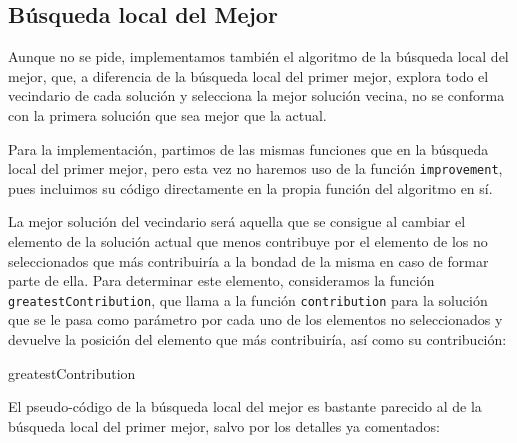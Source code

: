 \documentclass[11pt,a4paper]{article}
\begin{document}
	\subsection{Búsqueda local del Mejor}
	
	Aunque no se pide, implementamos también el algoritmo de la búsqueda local del mejor, que, a diferencia de la búsqueda local del primer mejor, explora todo el vecindario de cada solución y selecciona la mejor solución vecina, no se conforma con la primera solución que sea mejor que la actual. 
	
	Para la implementación, partimos de las mismas funciones que en la búsqueda local del primer mejor, pero esta vez no haremos uso de la función \lstinline|improvement|, pues incluimos su código directamente en la propia función del algoritmo en sí. 
	
	La mejor solución del vecindario será aquella que se consigue al cambiar el elemento de la solución actual que menos contribuye por el elemento de los no seleccionados que más contribuiría a la bondad de la misma en caso de formar parte de ella. Para determinar este elemento, consideramos la función \lstinline|greatestContribution|, que llama a la función \lstinline|contribution| para la solución que se le pasa como parámetro por cada uno de los elementos no seleccionados y devuelve la posición del elemento que más contribuiría, así como su contribución:
	
	\begin{algorithm}[H]
		\caption{\sc greatestContribution }
	
	\end{algorithm}
	
	El pseudo-código de la búsqueda local del mejor es bastante parecido al de la búsqueda local del primer mejor, salvo por los detalles ya comentados: 
	
\end{document}
